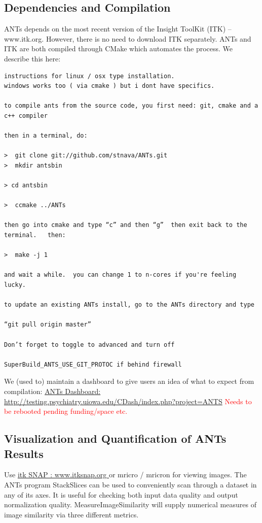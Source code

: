 \documentclass{InsightArticle}
\begin{document}
\subsection{Dependencies and Compilation}\label{sec:comp}
ANTs depends on the most recent version of the Insight ToolKit (ITK)
-- www.itk.org.  However, there is no need to download ITK separately.
ANTs and ITK are both compiled through CMake which automates the
process.  We describe this here: 
\begin{verbatim}
instructions for linux / osx type installation.   
windows works too ( via cmake ) but i dont have specifics.

to compile ants from the source code, you first need: git, cmake and a c++ compiler

then in a terminal, do:

>  git clone git://github.com/stnava/ANTs.git
>  mkdir antsbin

> cd antsbin

>  ccmake ../ANTs

then go into cmake and type “c” and then “g”  then exit back to the
terminal.   then:

>  make -j 1

and wait a while.  you can change 1 to n-cores if you're feeling lucky.

to update an existing ANTs install, go to the ANTs directory and type 

“git pull origin master”

Don’t forget to toggle to advanced and turn off

SuperBuild_ANTS_USE_GIT_PROTOC if behind firewall
\end{verbatim}
We (used to) maintain a dashboard to give users an idea of what to expect 
from compilation:\newline
\href{http://testing.psychiatry.uiowa.edu/CDash/index.php?project=ANTS}{ANTs
Dashboard: http://testing.psychiatry.uiowa.edu/CDash/index.php?project=ANTS}
\textcolor{red}{Needs to be rebooted pending funding/space etc.}

\subsection{Visualization and Quantification of ANTs Results}
Use \href{www.itksnap.org}{itk SNAP : www.itksnap.org } or mricro / mricron for viewing
images.  The ANTs program StackSlices can be used to conveniently scan
through a dataset in any of its axes.  It is useful for checking both
input data quality and output normalization quality.  MeasureImageSimilarity 
will supply numerical measures of image similarity via three different metrics. 
\end{document}
